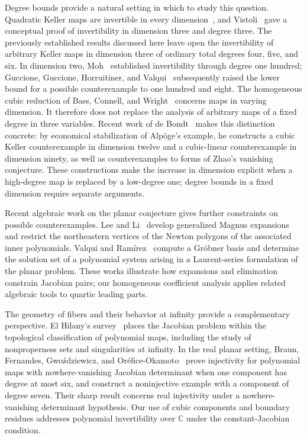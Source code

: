 \documentclass[11pt,reqno]{amsart}
\numberwithin{equation}{section}
\theoremstyle{plain}
\theoremstyle{definition}
\theoremstyle{remark}
\newcommand{\C}{\mathbb C}
\begin{document}
Degree bounds provide a natural setting in which to study this question.
Quadratic Keller maps are invertible in every dimension~\cite{Wang}, and
Vistoli~\cite{Vistoli} gave a conceptual proof of invertibility in dimension
three and degree three. The previously established results discussed here
leave open the invertibility of arbitrary Keller maps in dimension three
of ordinary total degrees four, five, and six.
In dimension two, Moh~\cite{Moh} established
invertibility through degree one hundred; Guccione, Guccione, Horruitiner,
and Valqui~\cite{GGHV} subsequently raised the lower bound for a possible
counterexample to one hundred and eight. The homogeneous cubic reduction
of Bass, Connell, and Wright~\cite{BCW} concerns maps in varying dimension.
It therefore does not replace the analysis of arbitrary maps of a fixed
degree in three variables. Recent work of de Bondt~\cite{dB26} makes
this distinction concrete: by economical stabilization of Alp\"oge's
example, he constructs a cubic Keller counterexample in dimension twelve
and a cubic-linear counterexample in dimension ninety, as well as
counterexamples to forms of Zhao's vanishing conjecture.
These constructions make the increase in dimension explicit when a
high-degree map is replaced by a low-degree one; degree bounds in a fixed
dimension require separate arguments.

Recent algebraic work on the planar conjecture gives further constraints
on possible counterexamples. Lee and Li~\cite{LL24} develop generalized
Magnus expansions and restrict the northeastern vertices of the Newton
polygons of the associated inner polynomials. Valqui and
Ram\'irez~\cite{VR25} compute a Gr\"obner basis and determine the solution
set of a polynomial system arising in a Laurent-series formulation of
the planar problem. These works illustrate how expansions and elimination
constrain Jacobian pairs; our homogeneous coefficient analysis applies
related algebraic tools to quartic leading parts.

The geometry of fibers and their behavior at infinity provide a
complementary perspective. El Hilany's survey~\cite{EH25} places the
Jacobian problem within the topological classification of polynomial
maps, including the study of nonproperness sets and singularities at
infinity. In the real planar setting, Braun, Fernandes,
Gwo\'zdziewicz, and Or\'efice-Okamoto~\cite{BFGO26} prove injectivity
for polynomial maps with nowhere-vanishing Jacobian determinant when
one component has degree at most six, and construct a noninjective
example with a component of degree seven. Their sharp result concerns
real injectivity under a nowhere-vanishing determinant hypothesis.
Our use of cubic components and boundary residues addresses polynomial
invertibility over $\C$ under the constant-Jacobian condition.
\end{document}
